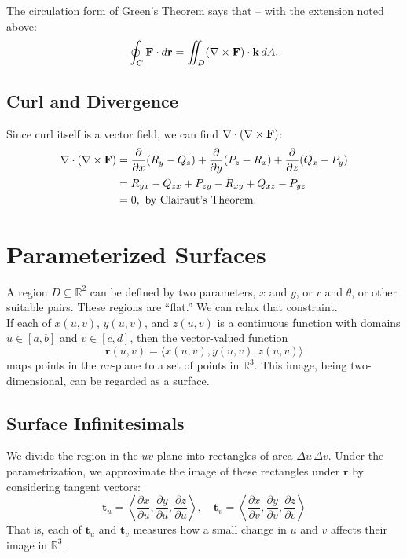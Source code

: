 The circulation form of Green’s Theorem says that – with the extension noted above:
\[
    \oint_C \mathbf{F} \cdot d\mathbf{r} = \iint_D (\nabla \times \mathbf{F}) \cdot \mathbf{k} \, dA.
\]

\subsection{Curl and Divergence}

Since curl itself is a vector field, we can find \(\nabla \cdot (\nabla \times \mathbf{F})\):
\begin{align*}
    \nabla \cdot (\nabla \times \mathbf{F}) &= \frac{\partial}{\partial x} (R_y - Q_z) + \frac{\partial}{\partial y} (P_z - R_x) + \frac{\partial}{\partial z} (Q_x - P_y) \\
    &= R_{yx} - Q_{zx} + P_{zy} - R_{xy} + Q_{xz} - P_{yz} \\
    &= 0, \text{ by Clairaut's Theorem.}
\end{align*}


\newpage

\section{Parameterized Surfaces}

A region \( D \subseteq \mathbb{R}^2 \) can be defined by two parameters, \( x \) and \( y \), or \( r \) and \( \theta \), or other suitable pairs. These regions are “flat.” We can relax that constraint. \\

If each of \( x(u, v) \), \( y(u, v) \), and \( z(u, v) \) is a continuous function with domains \( u \in [a, b] \) and \( v \in [c, d] \), then the vector-valued function
\[
\mathbf{r}(u, v) = \langle x(u, v), y(u, v), z(u, v) \rangle
\]
maps points in the \( uv \)-plane to a set of points in \( \mathbb{R}^3 \). This image, being two-dimensional, can be regarded as a surface.

\subsection{Surface Infinitesimals}

We divide the region in the \( uv \)-plane into rectangles of area \( \Delta u \, \Delta v \). Under the parametrization, we approximate the image of these rectangles under \( \mathbf{r} \) by considering tangent vectors:
\[
\mathbf{t}_u = \left\langle \frac{\partial x}{\partial u}, \frac{\partial y}{\partial u}, \frac{\partial z}{\partial u} \right\rangle, \quad 
\mathbf{t}_v = \left\langle \frac{\partial x}{\partial v}, \frac{\partial y}{\partial v}, \frac{\partial z}{\partial v} \right\rangle
\]
That is, each of \( \mathbf{t}_u \) and \( \mathbf{t}_v \) measures how a small change in \( u \) and \( v \) affects their image in \( \mathbb{R}^3 \). \\

